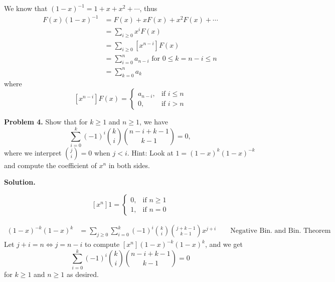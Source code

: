 We know that $ (1-x)^{-1}=1+x+x^2+\cdots $, thus
\begin{align*}
    F(x)(1-x)^{-1}
     & = F(x)+xF(x)+x^2F(x)+\cdots                                    \\
     & =\sum\limits_{i\geqslant 0}x^{i} F(x)                          \\
     & =\sum\limits_{i\geqslant 0}[x^{n-i}] F(x)                      \\
     & =\sum\limits_{i= 0}^{n} a_{n-i} \text{ for } 0\leq k=n-i\leq n \\
     & =\sum\limits_{k=0}^{n} a_k
\end{align*}
where
\[ [x^{n-i}]F(x)
    =\begin{cases}
        a_{n-i}, & \text{if } i\leqslant n \\
        0,       & \text{if } i>n
    \end{cases}
\]

\textbf{Problem 4.} Show that for $ k\geqslant 1 $ and $ n\geqslant 1 $, we have
\[ \sum\limits_{i=0}^{k} (-1)^i\binom{k}{i}\binom{n-i+k-1}{k-1}=0, \]
where we interpret $ \binom{j}{i}=0 $ when $ j<i $.
Hint: Look at $ 1=(1-x)^{k}(1-x)^{-k} $ and compute the coefficient of $ x^n $
in both sides.

\textbf{Solution.}

\[ [x^n]1=
    \begin{cases}
        0, & \text{if } n\geqslant 1 \\
        1, & \text{if } n=0
    \end{cases}
\]

\begin{align*}
    (1-x)^{-k}(1-x)^k
     & = \sum\limits_{j\geqslant 0} \sum\limits_{i=0}^{k}
    (-1)^i\binom{k}{i}\binom{j+k-1}{k-1}x^{j+i}\qquad\text{Negative Bin.\ and Bin. Theorem}
\end{align*}
Let $ j+i=n\iff j=n-i $ to compute $ [x^n](1-x)^{-k}(1-x)^k $, and we get
\[ \sum\limits_{i=0}^{k} (-1)^i\binom{k}{i}\binom{n-i+k-1}{k-1}=0 \]
for $ k\geqslant 1 $ and $ n\geqslant 1 $ as desired.
